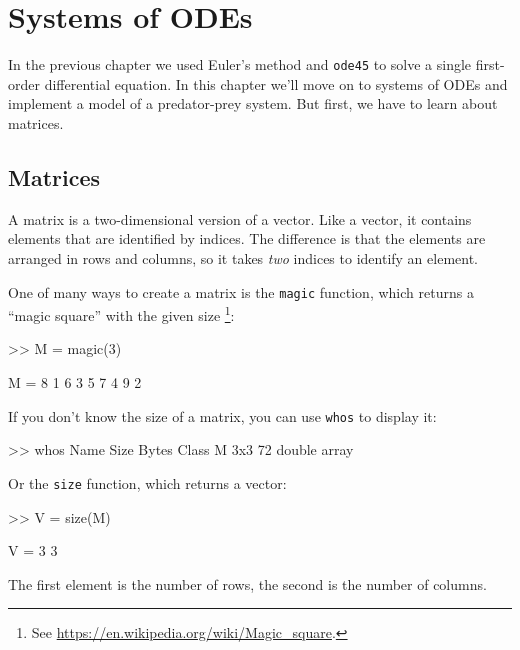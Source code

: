 \chapter{Systems of ODEs}
\label{systems}

In the previous chapter we used Euler's method and {\tt ode45} to solve a single first-order differential equation.  In this chapter we'll move on to systems of ODEs and implement a model of a predator-prey system.  But first, we have to learn about matrices.


\section{Matrices}

A matrix is a two-dimensional version of a vector.  Like a vector,
it contains elements that are identified by indices.  The difference
is that the elements are arranged in rows and columns, so it takes
{\em two} indices to identify an element.


One of many ways to create a matrix is the {\tt magic} function,
which returns a ``magic square'' with the given size 
\footnote{See \url{https://en.wikipedia.org/wiki/Magic_square}.}:


\begin{code}
>> M = magic(3)

M =  8     1     6
     3     5     7
     4     9     2
\end{code}

If you don't know the size of a matrix, you can use {\tt whos} to
display it:

\begin{code}
>> whos
  Name        Size                    Bytes  Class
  M           3x3                        72  double array
\end{code}

Or the {\tt size} function, which returns a vector:


\begin{code}
>> V = size(M)

V = 3     3
\end{code}

The first element is the number of rows, the second is the number of
columns.


